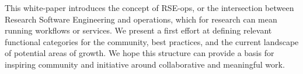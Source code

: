 This white-paper introduces the concept of RSE-ops, or the intersection between Research Software Engineering and operations, which for research can mean running workflows or services. We present a first effort at defining relevant functional categories for the community, best practices, and the current landscape of potential areas of growth. We hope this structure can provide a basis for inspiring community and initiative around collaborative and meaningful work.
